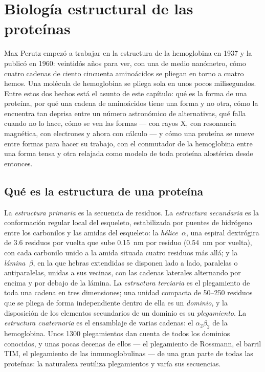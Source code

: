 \chapter{Biología estructural de las proteínas}\label{ch:b3:structural-biology}

Max Perutz empezó a trabajar en la estructura de la hemoglobina en 1937 y
la publicó en 1960: veintidós años para ver, con una  de medio
nanómetro, cómo cuatro cadenas de ciento cincuenta aminoácidos se pliegan
en torno a cuatro hemos. Una molécula de hemoglobina se pliega sola en
unos pocos milisegundos. Entre estos dos hechos está el asunto de este
capítulo: qué es la forma de una proteína, por qué una cadena de
aminoácidos tiene una forma y no otra, cómo la encuentra tan deprisa
entre un número astronómico de alternativas, qué falla cuando no lo hace,
cómo se ven las formas --- con rayos X, con resonancia magnética, con
electrones y ahora con cálculo --- y cómo una proteína se mueve entre
formas para hacer su trabajo, con el conmutador de la hemoglobina entre
una forma tensa y otra relajada como modelo de toda proteína alostérica
desde entonces.

\section{Qué es la estructura de una proteína}

\begin{definition}\label{def:b3:structural-biology:levels}
La \emph{estructura primaria} es la secuencia de residuos. La
\emph{estructura secundaria} es la conformación regular local del
esqueleto, estabilizada por puentes de hidrógeno entre los carbonilos y
las amidas del esqueleto: la \emph{hélice~$\alpha$}, una espiral dextrógira
de $3.6$ residuos por vuelta que sube \qty{0.15}{nm} por residuo
(\qty{0.54}{nm} por vuelta), con cada carbonilo unido a la amida situada
cuatro residuos más allá; y la \emph{lámina~$\beta$}, en la que hebras
extendidas se disponen lado a lado, paralelas o antiparalelas, unidas a
sus vecinas, con las cadenas laterales alternando por encima y por debajo
de la lámina. La \emph{estructura terciaria} es el plegamiento de toda
una cadena en tres dimensiones; una unidad compacta de \numrange{50}{250}
residuos que se pliega de forma independiente dentro de ella es un
\emph{dominio}, y la disposición de los elementos secundarios de un
dominio es su \emph{plegamiento}. La \emph{estructura cuaternaria} es el
ensamblaje de varias cadenas: el $\alpha_{2}\beta_{2}$ de la hemoglobina.
Unos \num{1300} plegamientos dan cuenta de todos los dominios conocidos,
y unas pocas decenas de ellos --- el plegamiento de Rossmann, el barril
TIM, el plegamiento de las inmunoglobulinas --- de una gran parte de
todas las proteínas: la naturaleza reutiliza plegamientos y varía sus
secuencias.
\end{definition}

